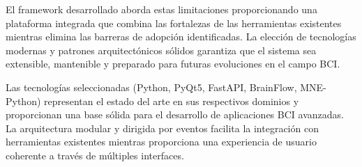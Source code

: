 
El framework desarrollado aborda estas limitaciones proporcionando una plataforma integrada que combina las fortalezas de las herramientas existentes mientras elimina las barreras de adopción identificadas. La elección de tecnologías modernas y patrones arquitectónicos sólidos garantiza que el sistema sea extensible, mantenible y preparado para futuras evoluciones en el campo BCI.

Las tecnologías seleccionadas (Python, PyQt5, FastAPI, BrainFlow, MNE-Python) representan el estado del arte en sus respectivos dominios y proporcionan una base sólida para el desarrollo de aplicaciones BCI avanzadas. La arquitectura modular y dirigida por eventos facilita la integración con herramientas existentes mientras proporciona una experiencia de usuario coherente a través de múltiples interfaces.
